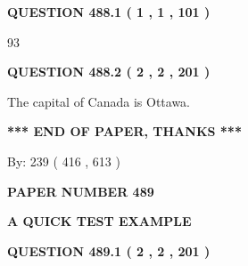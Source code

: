 \documentclass[12pt]{article}
\begin{document}
{\textbf{\Large{QUESTION
488.1 
 ( 1 , 1 , 101 )
}}}
  
  
 
 
\noindent{}

93
 
 
  
\vspace{0.2in}
  
{\textbf{\Large{QUESTION
488.2 
 ( 2 , 2 , 201 )
}}}
  
  
 
 
\noindent{}
 
 
The capital of Canada is Ottawa.
 
 
 
 
   
   
 \vspace{0.2in}
 
   
   
   
   
\vspace{1.0in} 
{\textbf{\large{ *** END OF PAPER, THANKS *** }}} 
   
   
\hspace{1.0in} By: 
 239 ( 416 ,  613 )
   
   
   
   
\newpage 
\setcounter{page}{ 
   489001 } 
   
   
   
   
 {\textbf{ \Large{ PAPER NUMBER  489  }}}
   
   
\vspace{0.2in}
   
   
   
   
   
   
 \vspace{0.2in}
{\LARGE {\textbf{ A QUICK TEST EXAMPLE}}}
   
   
  
\vspace{0.2in}
  
{\textbf{\Large{QUESTION
489.1 
 ( 2 , 2 , 201 )
}}}
  
  
 
 
\noindent{}
 
\end{document}
